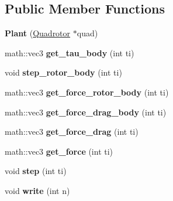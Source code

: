 \subsection*{\-Public \-Member \-Functions}
\begin{DoxyCompactItemize}
\item 
\hypertarget{classPlant_a142ca8e3ae860d3b93f5de973be71e39}{{\bfseries \-Plant} (\hyperlink{classQuadrotor}{\-Quadrotor} $\ast$quad)}\label{classPlant_a142ca8e3ae860d3b93f5de973be71e39}

\item 
\hypertarget{classPlant_a9b61938a3973f7dc3bd2511bcb377615}{math\-::vec3 {\bfseries get\-\_\-tau\-\_\-body} (int ti)}\label{classPlant_a9b61938a3973f7dc3bd2511bcb377615}

\item 
\hypertarget{classPlant_a0cd2196cba6ec3725c7d3c9146ae2f3c}{void {\bfseries step\-\_\-rotor\-\_\-body} (int ti)}\label{classPlant_a0cd2196cba6ec3725c7d3c9146ae2f3c}

\item 
\hypertarget{classPlant_a0aec8e6b4599646841cbf16370e8726c}{math\-::vec3 {\bfseries get\-\_\-force\-\_\-rotor\-\_\-body} (int ti)}\label{classPlant_a0aec8e6b4599646841cbf16370e8726c}

\item 
\hypertarget{classPlant_a103c83a20c439d3944f14fca3aa42cd1}{math\-::vec3 {\bfseries get\-\_\-force\-\_\-drag\-\_\-body} (int ti)}\label{classPlant_a103c83a20c439d3944f14fca3aa42cd1}

\item 
\hypertarget{classPlant_a5d36154e55ed37ade1997289fe6dbdf9}{math\-::vec3 {\bfseries get\-\_\-force\-\_\-drag} (int ti)}\label{classPlant_a5d36154e55ed37ade1997289fe6dbdf9}

\item 
\hypertarget{classPlant_a992691a9ab2614199f2295dc825d583b}{math\-::vec3 {\bfseries get\-\_\-force} (int ti)}\label{classPlant_a992691a9ab2614199f2295dc825d583b}

\item 
\hypertarget{classPlant_af5c6f03354c0cf11a968e88381fe89ab}{void {\bfseries step} (int ti)}\label{classPlant_af5c6f03354c0cf11a968e88381fe89ab}

\item 
\hypertarget{classPlant_a59da9eafd398a9230723c13096a958cb}{void {\bfseries write} (int n)}\label{classPlant_a59da9eafd398a9230723c13096a958cb}

\end{DoxyCompactItemize}
